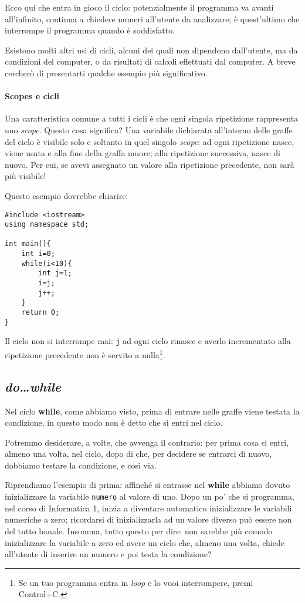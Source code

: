 	Ecco qui che entra in gioco il ciclo: potenzialmente il programma va avanti all'infinito, continua a chiedere numeri all'utente da analizzare; è quest'ultimo che interrompe il programma quando è soddisfatto.
	
	Esistono molti altri usi di cicli, alcuni dei quali non dipendono dall'utente, ma da condizioni del computer, o da risultati di calcoli effettuati dal computer. A breve cercherò di presentarti qualche esempio più significativo.\\
	
	\paragraph{Scopes e cicli}
	Una caratteristica comune a tutti i cicli è che ogni singola ripetizione rappresenta uno \emph{scope}. Questo cosa significa? Una variabile dichiarata all'interno delle graffe del ciclo è visibile solo e soltanto in quel singolo \emph{scope}: ad ogni ripetizione nasce, viene usata e alla fine della graffa muore; alla ripetizione successiva, nasce di nuovo. Per cui, se avevi assegnato un valore alla ripetizione precedente, non sarà più visibile!
	
	Questo esempio dovrebbe chiarire:
\begin{lstlisting}
#include <iostream>
using namespace std;

int main(){
	int i=0;
	while(i<10){
		int j=1;
		i=j;
		j++; 	
	}
	return 0;
}
\end{lstlisting}
	Il ciclo non si interrompe mai: \verb|j| ad ogni ciclo rinasce e averlo incrementato alla ripetizione precedente non è servito a nulla\footnote{Se un tuo programma entra in \emph{loop} e lo vuoi interrompere, premi Control+C.}. 
	\subsection{\emph{do\ldots while}}
	Nel ciclo \textbf{while}, come abbiamo visto, prima di entrare nelle graffe viene testata la condizione, in questo modo non è detto che si entri nel ciclo. 
	
	Potremmo desiderare, a volte, che avvenga il contrario: per prima cosa si entri, almeno una volta, nel ciclo, dopo di che, per decidere se entrarci di nuovo, dobbiamo testare la condizione, e così via.
	
	Riprendiamo l'esempio di prima: affinché si entrasse nel \textbf{while} abbiamo dovuto inizializzare la variabile \verb|numero| al valore di uno. Dopo un po' che si programma, nel corso di Informatica 1, inizia a diventare automatico inizializzare le variabili numeriche a zero; ricordarsi di inizializzarla ad un valore diverso può essere non del tutto banale. Insomma, tutto questo  per dire: non sarebbe più comodo inizializzare la variabile a zero ed avere un ciclo che, almeno una volta, chiede all'utente di inserire un numero e poi testa la condizione?\\
	
